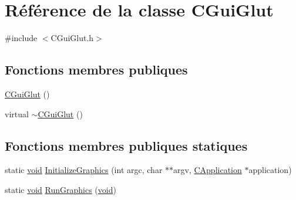 \hypertarget{class_c_gui_glut}{\section{Référence de la classe C\-Gui\-Glut}
\label{class_c_gui_glut}
}


{\ttfamily \#include $<$C\-Gui\-Glut.\-h$>$}

\subsection*{Fonctions membres publiques}
\begin{DoxyCompactItemize}
\item 
\hyperlink{class_c_gui_glut_a574d62a27525fba7eee3fadcc0079665}{C\-Gui\-Glut} ()
\item 
virtual \hyperlink{class_c_gui_glut_aa218520a7f4a2d2a6fee447226b33fdf}{$\sim$\-C\-Gui\-Glut} ()
\end{DoxyCompactItemize}
\subsection*{Fonctions membres publiques statiques}
\begin{DoxyCompactItemize}
\item 
static \hyperlink{glu_8h_a4292190e3f1f6b373a760c7d9316ad3c}{void} \hyperlink{class_c_gui_glut_a593668780f9c164e730872a2a5e9633a}{Initialize\-Graphics} (int argc, char $\ast$$\ast$argv, \hyperlink{class_c_application}{C\-Application} $\ast$application)
\item 
static \hyperlink{glu_8h_a4292190e3f1f6b373a760c7d9316ad3c}{void} \hyperlink{class_c_gui_glut_a3137ce1e74cc56d756b2656933769e2f}{Run\-Graphics} (\hyperlink{glu_8h_a4292190e3f1f6b373a760c7d9316ad3c}{void})
\end{DoxyCompactItemize}

